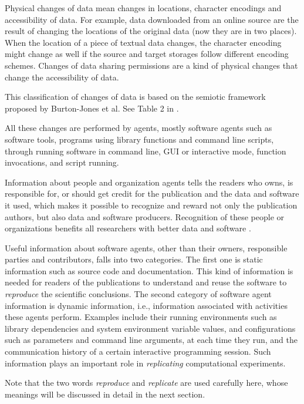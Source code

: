 Physical changes of data mean changes in locations, character encodings and accessibility of data. 
For example, data downloaded from an online source are the result of changing the locations of the 
original data (now they are in two places). When the location of a piece of textual data changes, the 
character encoding might change as well if the source and target storages follow different encoding 
schemes. Changes of data sharing permissions are a kind of physical changes that change the 
accessibility of data. 

This classification of changes of data is based on the semiotic framework proposed by Burton-Jones et al. See Table 2 in \cite{burton2005semiotic}.

All these changes are performed by agents, mostly software agents such as software tools, programs 
using library functions and command line scripts, through running software in command line, GUI or 
interactive mode, function invocations, and script running.

Information about people and organization agents tells the readers who owns, is responsible for, or 
should get credit for the publication and the data and software it used, which makes it possible to 
recognize and reward not only the publication authors, but also data and software producers. 
Recognition of these people or organizations benefits all researchers with better data and software 
\cite{parsons2010data, goble2014better}.

Useful information about software agents, other than their owners, responsible parties and 
contributors, falls into two categories. The first one is static information such as source code and 
documentation. This kind of information is needed for readers of the publications to understand and 
reuse the software to \emph{reproduce} the scientific conclusions. The second category of software 
agent information is dynamic information, i.e., information associated with activities these agents 
perform. Examples include their running environments such as library dependencies and system 
environment variable values, and configurations such as parameters and command line arguments, at 
each time they run, and the communication history of a certain interactive programming session. Such 
information plays an important role in \emph{replicating} computational experiments.

Note that the two words \emph{reproduce} and \emph{replicate} are used carefully here, whose meanings 
will be discussed in detail in the next section.


